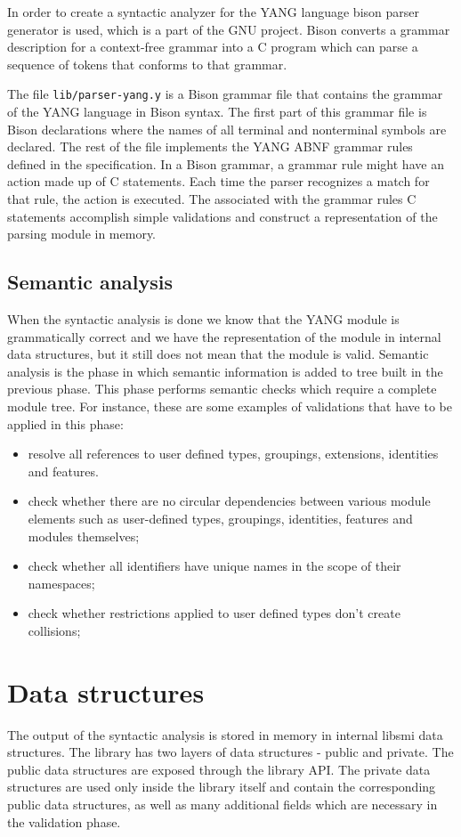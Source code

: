 \documentclass[conference]{IEEEtran}
\begin{document}
In order to create a syntactic analyzer for the YANG language bison parser generator \cite{bib6} is used, which is a part of the GNU project. Bison converts a grammar description for a context-free grammar into a C program which can parse a sequence of tokens that conforms to that grammar. 

The file \texttt{lib/parser-yang.y} is a Bison grammar file that contains the grammar of the YANG language in Bison syntax. The first part of this grammar file is Bison declarations where the names of all terminal and nonterminal symbols are declared. The rest of the file implements the YANG ABNF grammar rules defined in the specification. In a Bison grammar, a grammar rule might have an action made up of C statements. Each time the parser recognizes a match for that rule, the action is executed. The associated with the grammar rules C statements accomplish simple validations and construct a representation of the parsing module in memory.

\subsection{Semantic analysis}
When the syntactic analysis is done we know that the YANG module is grammatically correct and we have the representation of the module in internal data structures, but it still does not mean that the  module is valid. Semantic analysis is the phase in which semantic information is added to tree built in the previous phase. This phase performs semantic checks which require a complete module tree. For instance, these are some examples of validations that have to be applied in this phase:
\begin{itemize}
\item resolve all references to user defined types, groupings, extensions, identities and features.
\item check whether there are no
  circular dependencies between various module elements such as user-defined types, groupings, identities, features and modules themselves;
\item check whether all identifiers have unique names in the scope of their namespaces;
\item check whether restrictions applied to user defined types don't create collisions;
\end{itemize}

\section{Data structures}
The output of the syntactic analysis is stored in memory in internal libsmi data structures. The library has two layers of data structures - public and private. The public data structures are exposed through the library API. The private data structures are used only inside the library itself and contain the corresponding public data structures, as well as many additional fields which are necessary in the validation phase. 
\end{document}
